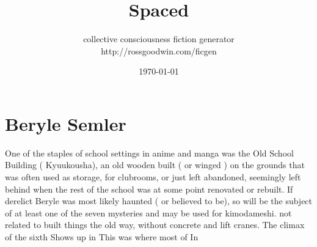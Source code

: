 \documentclass[12pt]{book}
\title{Spaced}
\author{collective consciousness fiction generator\\http://rossgoodwin.com/ficgen}
\date{\today}
\begin{document}
\maketitle



\chapter{Beryle Semler}

One of the staples of school settings in anime and manga was the Old School Building ( Kyuukousha), an old wooden built ( or winged ) on the grounds that was often used as storage, for clubrooms, or just left abandoned, seemingly left behind when the rest of the school was at some point renovated or rebuilt. If derelict Beryle was most likely haunted ( or believed to be), so will be the subject of at least one of the seven mysteries and may be used for kimodameshi. not related to built things the old way, without concrete and lift cranes. The climax of the sixth Shows up in This was where most of In
\end{document}
